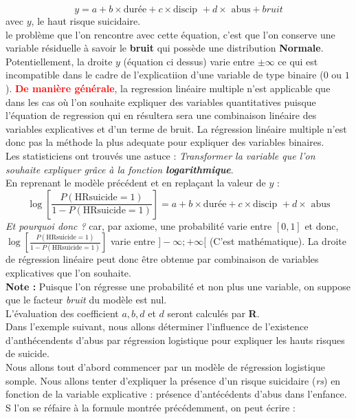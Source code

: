 $$y= a + b\times\textrm{durée} + c\times\textrm{discip } + d\times\textrm{ abus} + bruit$$
avec $y$, le haut risque suicidaire.\newline
\\
le problème que l'on rencontre avec cette équation, c'est que l'on conserve une variable résiduelle à savoir le \textbf{bruit} qui possède une distribution \textbf{Normale}. Potentiellement, la droite $y$ (équation ci dessus) varie entre $\pm \infty$ ce qui est incompatible dans le cadre de l'explicatiion d'une variable de type binaire ($0$ ou $1$).\newline 
\textcolor{red}{\textbf{De manière générale}}, la regression linéaire multiple n'est applicable que dans les cas où l'on souhaite expliquer des variables quantitatives puisque l'équation de regression qui en résultera sera une combinaison linéaire des variables explicatives et d'un terme de bruit.\newline
La régression linéaire multiple n'est donc pas la méthode la plus adequate pour expliquer des variables binaires.\newline 
\\
Les statisticiens ont trouvés une astuce : \textit{Transformer la variable que l'on souhaite expliquer grâce à la fonction \textbf{logarithmique}}.\newline
\\
En reprenant le modèle précédent et en replaçant la valeur de $y$ : 
$$\log\left[\frac{P(\textrm{HRsuicide} = 1)}{1-P(\textrm{HRsuicide} = 1)}\right] = a + b\times\textrm{durée} + c\times\textrm{discip } + d\times\textrm{ abus}$$
\textit{Et pourquoi donc ? } car, par axiome, une probabilité varie entre $[0,1]$ et donc, $\log\left[\frac{P(\textrm{HRsuicide} = 1)}{1-P(\textrm{HRsuicide} = 1)}\right]$ varie entre $]-\infty;+\infty[$ (C'est mathématique). La droite de régression linéaire peut donc être obtenue par combinaison de variables explicatives que l'on souhaite.\newline
\\
\textbf{Note : } Puisque l'on régresse une probabilité et non plus une variable, on suppose que le facteur \textit{bruit} du modèle est nul.\newline
\\
L'évaluation des coefficient $a,b,d$ et $d$ seront calculés par \textbf{R}.\newline
\\
Dans l'exemple suivant, nous allons déterminer l'influence de l'existence d'anthécendents d'abus par régression logistique pour expliquer les hauts risques de suicide.\newline
\\
Nous allons tout d'abord commencer par un modèle de régression logistique somple. Nous allons tenter d'expliquer la présence d'un risque suicidaire (\textit{rs}) en fonction de la variable explicative : présence d'antécédents d'abus dans l'enfance.\newline 
S l'on se réfaire à la formule montrée précédemment, on peut écrire : 

